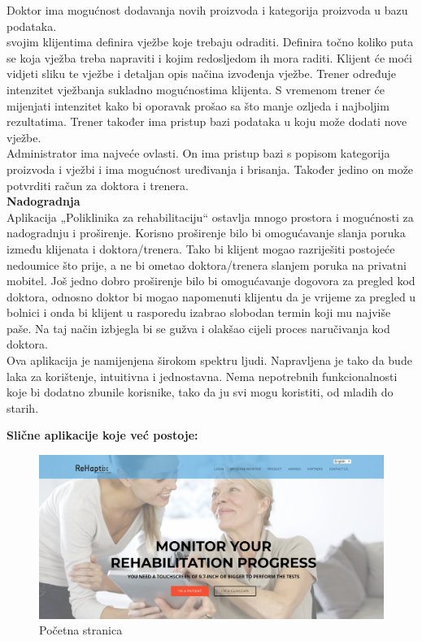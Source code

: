 		Doktor ima mogućnost dodavanja novih proizvoda i kategorija proizvoda u bazu podataka.\\	
		
		svojim klijentima definira vježbe koje trebaju odraditi. Definira točno koliko puta se koja vježba treba napraviti i kojim redosljedom ih mora raditi. Klijent će moći vidjeti sliku te vježbe i detaljan opis načina izvođenja vježbe. Trener određuje intenzitet vježbanja sukladno mogućnostima klijenta. S vremenom trener će mijenjati intenzitet kako bi oporavak prošao sa što manje ozljeda i najboljim rezultatima. Trener također ima pristup bazi podataka u koju može dodati nove vježbe.\\
		
		Administrator ima najveće ovlasti. On ima pristup bazi s  popisom kategorija proizvoda i vježbi i ima mogućnost uređivanja i brisanja. Također jedino on može potvrditi račun za doktora i trenera.\\
		
		\noindent \textbf{Nadogradnja}\\
		Aplikacija „Poliklinika za rehabilitaciju“ ostavlja mnogo prostora i mogućnosti za nadogradnju i proširenje. Korisno proširenje bilo bi omogućavanje slanja poruka između klijenata i doktora/trenera. Tako bi klijent mogao razriješiti postojeće nedoumice što prije, a ne bi ometao doktora/trenera slanjem poruka na privatni mobitel. Još jedno dobro proširenje bilo bi omogućavanje dogovora za pregled kod doktora, odnosno doktor bi mogao napomenuti klijentu da je vrijeme za pregled u bolnici i onda bi klijent u rasporedu izabrao slobodan termin koji mu najviše paše. Na taj način izbjegla bi se gužva i olakšao cijeli proces naručivanja kod doktora.\\
		
		Ova aplikacija je namijenjena širokom spektru ljudi. Napravljena je tako da bude laka za korištenje, intuitivna i jednostavna. Nema nepotrebnih funkcionalnosti koje bi dodatno zbunile korisnike, tako da ju svi mogu koristiti, od mladih do starih.
		
		\newpage
		
		\noindent \textbf{Slične aplikacije koje već postoje:}\\
		
		\begin{figure}[h]
			\centering
			\includegraphics[scale=0.3]{slike/rehaptix1.png}
			\caption{Početna stranica}
		\end{figure}
	
